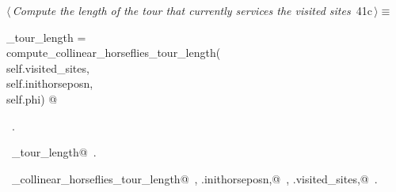 \documentclass[11.5pt]{report}
\begin{document}
\vspace{-0.8cm}\newchunk 

\begin{flushleft} \small\label{scrap60}\raggedright\small
{} $\langle\,${\itshape Compute the length of the tour that currently services the visited sites}\nobreak\ {\footnotesize {41c}}$\,\rangle\equiv$
\vspace{-1ex}
\begin{list}{}{} \item
\mbox{}\verb@current_tour_length    = \@\\
\mbox{}\verb@         compute_collinear_horseflies_tour_length(\@\\
\mbox{}\verb@                    self.visited_sites,\@\\
\mbox{}\verb@                    self.inithorseposn,\@\\
\mbox{}\verb@                    self.phi) @\\
\mbox{}\verb@@{\NWsep}
\end{list}
\vspace{-1.5ex}
\footnotesize
\begin{list}{}{\setlength{\itemsep}{-\parsep}\setlength{\itemindent}{-\leftmargin}}
\item \NWtxtMacroRefIn\ .
\item \NWtxtIdentsDefed\nobreak\  \verb@current_tour_length@\nobreak\ .\item \NWtxtIdentsUsed\nobreak\  \verb@compute_collinear_horseflies_tour_length@\nobreak\ , \verb@self.inithorseposn,@\nobreak\ , \verb@self.visited_sites,@\nobreak\ .
\item{}
\end{list}
\vspace{4ex}
\end{flushleft}

\vspace{-0.8cm}\newchunk 
\end{document}
